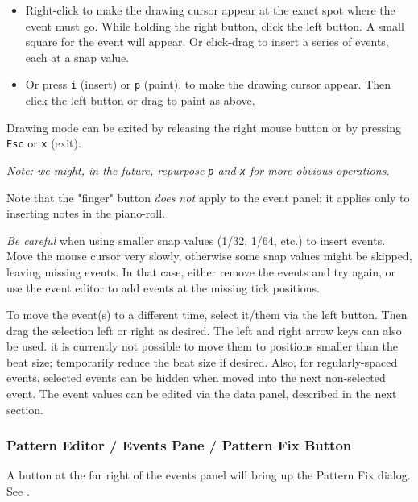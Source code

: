    \begin{itemize}
      \item Right-click to make the drawing cursor appear at
         the exact spot where the event must go.  While holding the right
         button, click the left button.
         A small square for the event will appear.
         Or click-drag to insert a
         series of events, each at a snap value.
      \item Or press \texttt{i} (insert) or \texttt{p} (paint).
         to make the drawing cursor appear.
         Then click the left button or drag to paint as above.
   \end{itemize}

   Drawing mode can be exited by releasing the right mouse button or
   by pressing \texttt{Esc} or \texttt{x} (exit).

   \textsl{Note: we might, in the future, repurpose \texttt{p} and
   \texttt{x} for more obvious operations.}

   Note that the "finger" button \textsl{does not} apply to the event panel;
   it applies only to inserting notes in the piano-roll.

   \textsl{Be careful}
   when using smaller snap values (1/32, 1/64, etc.) to insert events.
   Move the mouse cursor very slowly, otherwise some snap values might be
   skipped, leaving missing events.  In that case, either remove the events and
   try again, or use the event editor to add events at the missing tick
   positions.

   To move the event(s) to a different time, select it/them via the left
   button.  Then drag the selection left or right as desired.
   The left and right arrow keys can also be used.
   it is currently not possible to move them to positions smaller than the
   beat size; temporarily reduce the beat size if desired.
   Also, for regularly-spaced events, selected events can be hidden when moved
   into the next non-selected event.
   The event values can be edited via the data panel, described in the next
   section.
 
\subsubsection{Pattern Editor / Events Pane / Pattern Fix Button}
\label{subsubsec:pattern_editor_events_pane_pattern_fix}

   A button at the far right of the events panel will
   bring up the Pattern Fix dialog.
   See .

